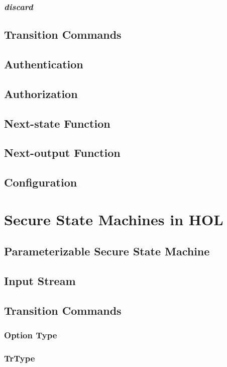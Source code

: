 \documentclass[../../main/main.tex]{subfiles}
\begin{document}
\subsubsection{\textit{discard}}
\subsection{Transition Commands}
\subsection{Authentication}
\subsection{Authorization}
\subsection{Next-state Function}
\subsection{Next-output Function}
\subsection{Configuration}


\section{Secure State Machines in HOL}\label{sec:sminHOL}

\subsection{Parameterizable Secure State Machine}
\subsection{Input Stream}
\subsection{Transition Commands}
\subsubsection{Option Type}
\subsubsection{TrType}
\end{document}
